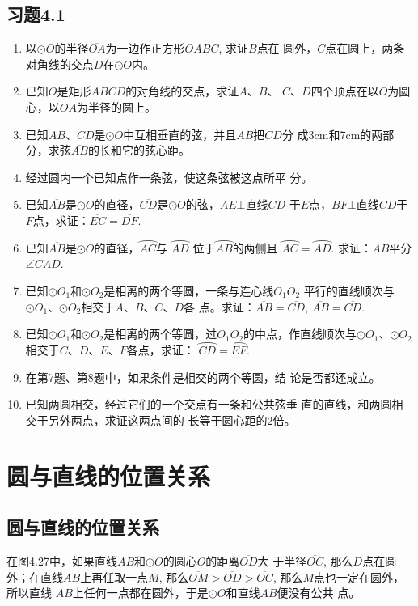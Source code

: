 \subsection*{习题4.1}
\begin{enumerate}
\item 以$\odot O$的半径$\overline{OA}$为一边作正方形$OABC$, 求证$B$点在
圆外，$C$点在圆上，两条对角线的交点$D$在$\odot O$内。
\item 已知$O$是矩形$ABCD$的对角线的交点，求证$A$、$B$、
$C$、$D$四个顶点在以$O$为圆心，以$OA$为半径的圆上。
\item 已知$AB$、$CD$是$\odot O$中互相垂直的弦，并且$\overline{AB}$把$\overline{CD}$分
成3cm和7cm的两部分，求弦$\overline{AB}$的长和它的弦心距。
\item 经过圆内一个已知点作一条弦，使这条弦被这点所平
分。
\item 已知$\overline{AB}$是$\odot O$的直径，$\overline{CD}$是$\odot O$的弦，$AE\bot $直线$CD$
于$E$点，$BF\bot $直线$CD$于$F$点，求证：$\overline{EC}=\overline{DF}$.
\item 已知$\overline{AB}$是$\odot O$的直径，$\wideparen{AC}$与
$\wideparen{AD}$
位于$\wideparen{AB}$的两侧且
$\wideparen{AC}=\wideparen{AD}$. 求证：$AB$平分$\angle CAD$.
\item 已知$\odot O_1$和$\odot O_2$是相离的两个等圆，一条与连心线$O_1O_2$
平行的直线顺次与$\odot O_1$、$\odot O_2$相交于$A$、$B$、$C$、$D$各
点。求证：$\overline{AB}=\overline{CD}$, $\overline{AB}=\overline{CD}$.
\item 已知$\odot O_1$和$\odot O_2$是相离的两个等圆，过$\overline{O_1O_2}$的中点，作直线顺次与$\odot O_1$、$\odot O_2$相交于$C$、$D$、$E$、$F$各点，求证：
$\wideparen{CD}=\wideparen{EF}$.
\item 在第7题、第8题中，如果条件是相交的两个等圆，结
论是否都还成立。
\item 已知两圆相交，经过它们的一个交点有一条和公共弦垂
直的直线，和两圆相交于另外两点，求证这两点间的
长等于圆心距的2倍。
\end{enumerate}

\section{圆与直线的位置关系}
\subsection{圆与直线的位置关系}
在图4.27中，如果直线$AB$和$\odot O$的圆心$O$的距离$\overline{OD}$大
于半径$\overline{OC}$, 那么$D$点在圆外；在直线${AB}$上再任取一点$M$, 
那么$\overline{OM}>\overline{OD}>\overline{OC}$, 那么$M$点也一定在圆外，所以直线
$AB$上任何一点都在圆外，于是$\odot O$和直线$AB$便没有公共
点。

